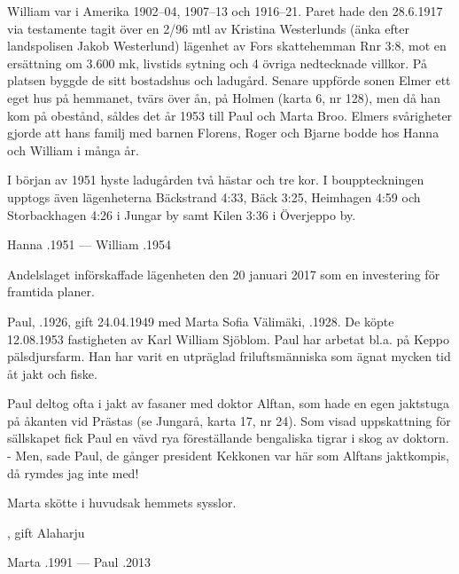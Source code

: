 William var i Amerika 1902--04, 1907--13 och 1916--21. Paret hade den 28.6.1917 via testamente tagit över en 2/96 mtl av Kristina 	Westerlunds (änka efter landspolisen Jakob Westerlund) lägenhet av Fors skattehemman Rnr 3:8, mot en ersättning om 3.600 mk, livstids sytning och 4 övriga nedtecknade villkor. På platsen byggde de sitt bostadshus och ladugård. Senare uppförde sonen Elmer ett eget hus på hemmanet, tvärs över ån, på Holmen (karta 6, nr 128), men då han kom på obestånd, såldes det år 1953 till Paul och Marta Broo. Elmers svårigheter gjorde att hans familj med barnen Florens, Roger och Bjarne bodde hos Hanna och William i många år.

I början av 1951 hyste ladugården två hästar och tre kor. I bouppteckningen upptogs även lägenheterna Bäckstrand 4:33, Bäck 3:25, Heimhagen 4:59 och Storbackhagen 4:26 i Jungar by samt Kilen 3:36 i Överjeppo by.

Hanna .1951  --- 	William .1954





Andelslaget införskaffade lägenheten den 20 januari 2017 som en investering för framtida planer.\jhvspace{}



Paul, .1926, gift 24.04.1949 med Marta Sofia Välimäki, .1928. De köpte 12.08.1953 fastigheten av Karl William Sjöblom. Paul har arbetat bl.a. på Keppo pälsdjursfarm. Han har varit en utpräglad friluftsmänniska som ägnat mycken tid åt jakt och fiske.

Paul deltog ofta i jakt av fasaner med doktor Alftan, som hade en egen jaktstuga på åkanten vid Prästas (se Jungarå, karta 17, nr 24). Som visad uppskattning för sällskapet fick Paul en vävd rya föreställande bengaliska tigrar i skog av doktorn. - Men, sade Paul, de gånger president Kekkonen var här som Alftans jaktkompis, då rymdes jag inte med!

Marta skötte i huvudsak hemmets sysslor.
\begin{jhchildren}
  \item {}, gift Alaharju
  \item {}
\end{jhchildren}

Marta .1991  ---  Paul .2013


